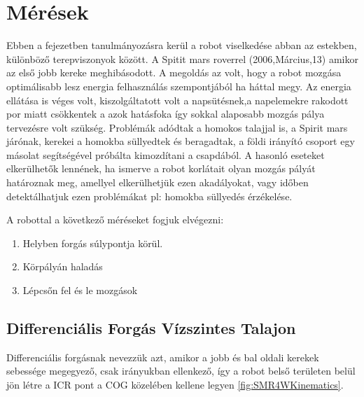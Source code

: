 \newpage
\section{Mérések}
Ebben a fejezetben tanulmányozásra kerül a robot viselkedése abban az estekben, különböző terepviszonyok között. A Spitit mars roverrel (2006,Március,13) \cite{SpititWheel1} amikor az első jobb kereke meghibásodott. A megoldás az volt, hogy a robot mozgása optimálisabb lesz energia felhasználás szempontjából ha háttal megy. Az energia ellátása is véges volt, kiszolgáltatott volt a napsütésnek,a napelemekre rakodott por miatt csökkentek a azok hatásfoka így sokkal alaposabb mozgás pálya tervezésre volt szükség.
Problémák adódtak a homokos talajjal is, a Spirit mars járónak, kerekei a homokba süllyedtek és beragadtak, a földi irányító csoport egy másolat segítségével próbálta kimozdítani a csapdából.
A hasonló eseteket elkerülhetők lennének, ha ismerve a robot korlátait olyan mozgás pályát határoznak meg, amellyel elkerülhetjük ezen akadályokat, vagy időben detektálhatjuk ezen problémákat pl: homokba süllyedés érzékelése.


A robottal a következő méréseket fogjuk elvégezni:
\begin{enumerate}[label=(\alph*)]
\item Helyben forgás súlypontja körül.
\item Körpályán haladás
\item Lépcsőn fel és le mozgások
\end{enumerate}


\subsection{Differenciális Forgás Vízszintes Talajon}

Differenciális forgásnak nevezzük azt, amikor a jobb és bal oldali kerekek sebessége megegyező, csak irányukban ellenkező, így a robot belső területen belül jön létre a ICR pont a COG közelében kellene legyen \ref{fig:SMR4WKinematics}. 
















